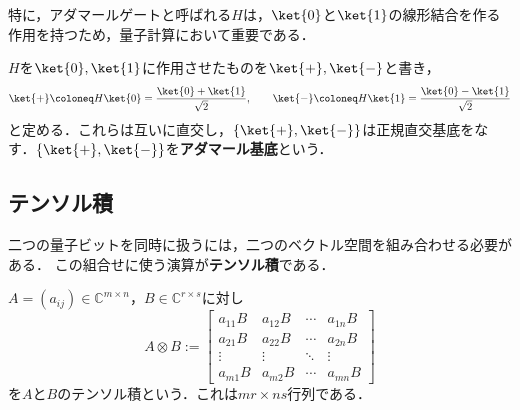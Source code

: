 特に，アダマールゲートと呼ばれる$H$は，$\ket{0}$と$\ket{1}$の線形結合を作る作用を持つため，量子計算において重要である．
\begin{defi}[アダマール基底]
  $H$を$\ket{0}, \ket{1}$に作用させたものを$\ket{+}, \ket{-}$と書き，
  \begin{equation*}
    \ket{+}\coloneq H\ket{0}=\frac{\ket{0}+\ket{1}}{\sqrt2},
    \qquad
    \ket{-} \coloneq H\ket{1}=\frac{\ket{0}-\ket{1}}{\sqrt2}
  \end{equation*}
  と定める．これらは互いに直交し，$\{\ket{+},\ket{-}\}$は正規直交基底をなす．$\{\ket{+},\ket{-}\}$を\textbf{アダマール基底}という．
\end{defi}

\subsection{テンソル積}

二つの量子ビットを同時に扱うには，二つのベクトル空間を組み合わせる必要がある．
この組合せに使う演算が\textbf{テンソル積}である．

\begin{defi}[行列のテンソル積]
  $A=(a_{ij})\in\mathbb{C}^{m\times n}$，$B\in\mathbb{C}^{r\times s}$に対し
  \begin{equation*}
    A\otimes B
    :=
    \begin{bmatrix}
      a_{11}B & a_{12}B & \cdots & a_{1n}B \\
      a_{21}B & a_{22}B & \cdots & a_{2n}B \\
      \vdots  & \vdots  & \ddots & \vdots  \\
      a_{m1}B & a_{m2}B & \cdots & a_{mn}B
    \end{bmatrix}
  \end{equation*}
  を$A$と$B$のテンソル積という．これは$mr\times ns$行列である．
\end{defi}

